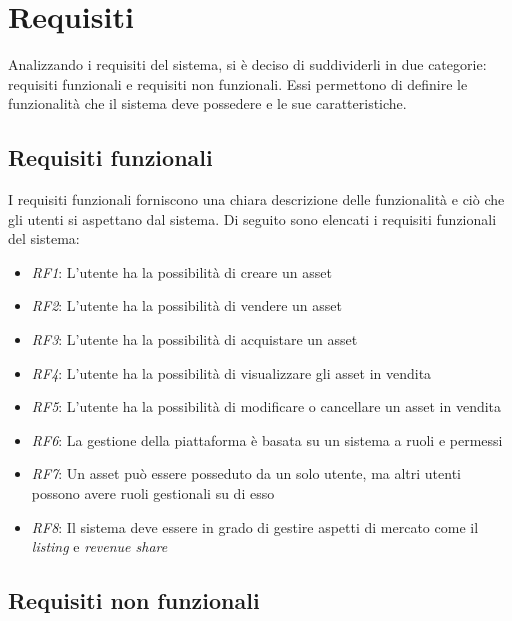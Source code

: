 \section{Requisiti}

Analizzando i requisiti del sistema, si è deciso di suddividerli in due categorie: requisiti funzionali e requisiti non funzionali. Essi permettono di definire le funzionalità che il sistema deve possedere e le sue caratteristiche. 

\subsection{Requisiti funzionali}

I requisiti funzionali forniscono una chiara descrizione delle funzionalità e ciò che gli utenti si aspettano dal sistema.
Di seguito sono elencati i requisiti funzionali del sistema: 
\begin{itemize}
    \item \textit{RF1}: L'utente ha la possibilità di creare un asset
    \item \textit{RF2}: L'utente ha la possibilità di vendere un asset
    \item \textit{RF3}: L'utente ha la possibilità di acquistare un asset
    \item \textit{RF4}: L'utente ha la possibilità di visualizzare gli asset in vendita
    \item \textit{RF5}: L'utente ha la possibilità di modificare o cancellare un asset in vendita
    \item \textit{RF6}: La gestione della piattaforma è basata su un sistema a ruoli e permessi
    \item \textit{RF7}: Un asset può essere posseduto da un solo utente, ma altri utenti possono avere ruoli gestionali su di esso
    \item \textit{RF8}: Il sistema deve essere in grado di gestire aspetti di mercato come il \textit{listing} e \textit{revenue share}
\end{itemize}

\subsection{Requisiti non funzionali}

